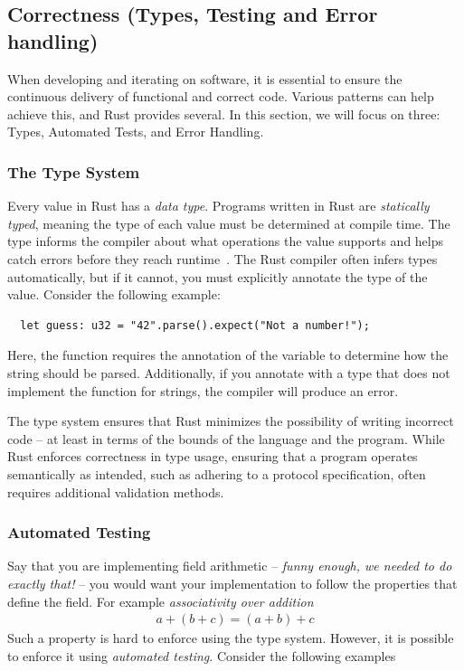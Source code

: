 \documentclass[11pt]{report}
\theoremstyle{definition}
\theoremstyle{plain}
\begin{document}
\subsection{Correctness (Types, Testing and Error handling)}
When developing and iterating on software, it is essential to ensure the continuous delivery of functional and correct code. Various patterns can help achieve this, and Rust provides several. In this section, we will focus on three: Types, Automated Tests, and Error Handling.

\subsubsection{The Type System}\label{sub:rusttypes}
Every value in Rust has a \textit{data type}. Programs written in Rust are \textit{statically typed}, meaning the type of each value must be determined at compile time. The type informs the compiler about what operations the value supports and helps catch errors before they reach runtime~\cite[ch.3.2]{rustlangRustProgramming}. The Rust compiler often infers types automatically, but if it cannot, you must explicitly annotate the type of the value. Consider the following example:

\begin{verbatim} 
  let guess: u32 = "42".parse().expect("Not a number!"); 
\end{verbatim}

Here, the  function requires the annotation of the variable  to determine how the string should be parsed. Additionally, if you annotate  with a type that does not implement the  function for strings, the compiler will produce an error.

The type system ensures that Rust minimizes the possibility of writing incorrect code -- at least in terms of the bounds of the language and the program. While Rust enforces correctness in type usage, ensuring that a program operates semantically as intended, such as adhering to a protocol specification, often requires additional validation methods.

\subsubsection{Automated Testing}
Say that you are implementing field arithmetic -- \textit{funny enough, we needed to do exactly that!} -- you would want your implementation to follow the properties that define the field. For example \textit{associativity over addition}
\begin{align}
  a + (b + c) = (a + b) + c
\end{align}
Such a property is hard to enforce using the type system. However, it is possible to enforce it using \textit{automated testing}. Consider the following examples
\end{document}
